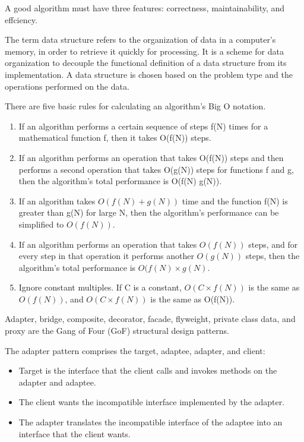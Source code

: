 \begin{mdframed}[style=theorem, frametitle={Algorithm Features}]
	A good algorithm must have three features: correctness, maintainability, and
effciency.
\end{mdframed}

\begin{mdframed}[style=important, frametitle={Data Structures}]
The term data structure refers to the organization of data in a
computer's memory, in order to retrieve it quickly for processing.
It is a scheme for data organization to decouple the functional
definition of a data structure from its implementation. A data
structure is chosen based on the problem type and the
operations performed on the data.
\end{mdframed}

There are five basic rules for calculating an algorithm’s Big O notation.

\begin{enumerate}
\item If an algorithm performs a certain sequence of steps f(N) times for a mathematical function f, then it takes O(f(N)) steps.
\item  If an algorithm performs an operation that takes O(f(N)) steps and then
performs a second operation that takes O(g(N)) steps for functions f and
g, then the algorithm’s total performance is O(f(N) g(N)).
\item  If an algorithm takes $O(f(N)+g(N))$ time and the function f(N) is greater
than g(N) for large N, then the algorithm’s performance can be simplified
to $O(f(N))$.
\item  If an algorithm performs an operation that takes $O(f(N))$ steps, and for
every step in that operation it performs another $O(g(N))$ steps, then the
algorithm’s total performance is $O(f(N)\times g(N)$.
\item  Ignore constant multiples. If C is a constant, $O(C \times f(N))$ is the same as
$O(f(N))$, and $O(C \times f(N))$ is the same as O(f(N)).
\end{enumerate}

Adapter, bridge, composite,
decorator, facade, flyweight, private class data, and proxy are the
Gang of Four (GoF) structural design patterns. 

The adapter pattern comprises the target, adaptee, adapter, and
client:
\begin{itemize}
\item Target is the interface that the client calls and invokes
methods on the adapter and adaptee.
\item The client wants the incompatible interface implemented
by the adapter.
\item The adapter translates the incompatible interface of the
adaptee into an interface that the client wants.
\end{itemize}

